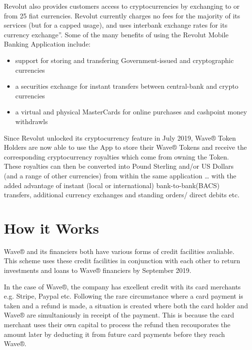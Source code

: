 \documentclass[letterpaper,10pt,openany,oneside,english]{sphinxmanual}
\begin{document}
\noindent{}

Revolut also provides customers access to cryptocurrencies by exchanging to or from 25 fiat currencies. Revolut currently charges no fees for the majority of its services (but for a capped usage), and uses interbank exchange rates for its currency exchange”. Some of the many benefits of using the Revolut Mobile Banking Application include:
\begin{itemize}
\item {} 
support for storing and transfering Government-issued and cryptographic currencies

\item {} 
a securities exchange for instant transfers between central-bank and crypto currencies

\item {} 
a virtual and physical MasterCards for online purchases and cashpoint money withdrawls

\end{itemize}

Since Revolut unlocked its cryptocurrency feature in July 2019, Wave® Token Holders are now able to use the App to store their Wave® Tokens and receive the corresponding cryptocurrency royalties which come from owning the Token. These royalties can then be converted into Pound Sterling and/or US Dollars (and a range of other currencies) from within the same application … with the added advantage of instant (local or international) bank-to-bank(BACS) transfers, additional currency exchanges and standing orders/ direct debits etc.


\chapter{How it Works}
\label{\detokenize{howitworks:how-it-works}}\label{\detokenize{howitworks::doc}}
Wave® and its financiers both have various forms of credit facilities avaliable. This scheme uses these credit facilities in conjunction with each other to return investments and loans to Wave® financiers by September 2019.

In the case of Wave®, the company has excellent credit with its card merchants e.g. Stripe, Paypal etc. Following the rare circumstance where a card payment is taken and a refund is made, a situation is created where both the card holder and Wave® are simultaniously in receipt of the payment. This is because the card merchant uses their own capital to process the refund then recouporates the amount later by deducting it from future card payments before they reach Wave®.
\end{document}
